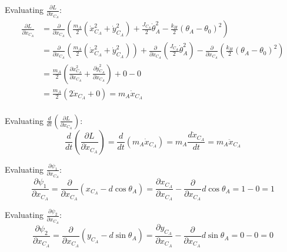 \documentclass[titlepage]{article}
\begin{document}
Evaluating $\frac{\partial L}{\partial\dot{x}_{C_A}}$:
\begin{equation}
	\begin{split}
		\frac{\partial L}{\partial\dot{x}_{C_A}}&=\frac{\partial}{\partial\dot{x}_{C_A}}\left(\frac{m_A}{2}\left(\dot{x}_{C_A}^2+\dot{y}_{C_A}^2\right)+\frac{J_{C_A}}{2}\dot{\theta}_A^2-\frac{k_H}{2}(\theta_A-\theta_0)^2\right) \\
		&=\frac{\partial}{\partial\dot{x}_{C_A}}\left(\frac{m_A}{2}\left(\dot{x}_{C_A}^2+\dot{y}_{C_A}^2\right)\right)+\frac{\partial}{\partial\dot{x}_{C_A}}\left(\frac{J_{C_A}}{2}\dot{\theta}_A^2\right)-\frac{\partial}{\partial\dot{x}_{C_A}}\left(\frac{k_H}{2}(\theta_A-\theta_0)^2\right) \\
		&=\frac{m_A}{2}\left(\frac{\partial\dot{x}_{C_A}^2}{\partial\dot{x}_{C_A}}+\frac{\partial\dot{y}_{C_A}^2}{\partial\dot{x}_{C_A}}\right)+0-0 \\
		&=\frac{m_A}{2}\left(2\dot{x}_{C_A}+0\right)=m_A\dot{x}_{C_A} \\
	\end{split}
\end{equation}

Evaluating $\frac{d}{dt}\left(\frac{\partial L}{\partial\dot{x}_{C_A}}\right)$:
\begin{equation}
	\frac{d}{dt}\left(\frac{\partial L}{\partial\dot{x}_{C_A}}\right)=\frac{d}{dt}\left(m_A\dot{x}_{C_A}\right)=m_A\frac{d\dot{x}_{C_A}}{dt}=m_A\ddot{x}_{C_A}
\end{equation}

Evaluating $\frac{\partial\psi_1}{\partial x_{C_A}}$:
\begin{equation}
	\frac{\partial\psi_1}{\partial x_{C_A}}=\frac{\partial}{\partial x_{C_A}}\left(x_{C_A}-d\cos\theta_A\right)=\frac{\partial x_{C_A}}{\partial x_{C_A}}-\frac{\partial}{\partial x_{C_A}}d\cos\theta_A=1-0=1
\end{equation}

Evaluating $\frac{\partial\psi_2}{\partial x_{C_A}}$:
\begin{equation}
	\frac{\partial\psi_2}{\partial x_{C_A}}=\frac{\partial}{\partial x_{C_A}}\left(y_{C_A}-d\sin\theta_A\right)=\frac{\partial y_{C_A}}{\partial x_{C_A}}-\frac{\partial}{\partial x_{C_A}}d\sin\theta_A=0-0=0
\end{equation}
\end{document}
